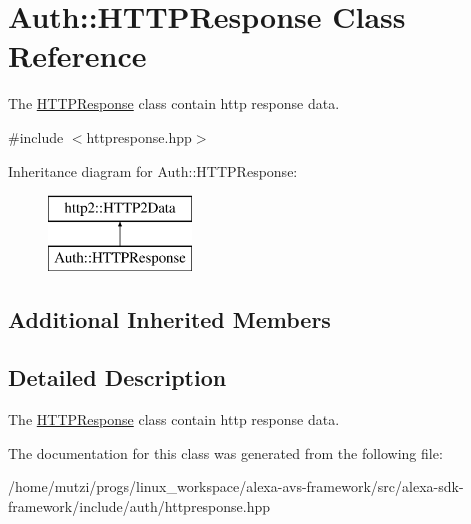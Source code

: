\hypertarget{classAuth_1_1HTTPResponse}{}\section{Auth\+:\+:H\+T\+T\+P\+Response Class Reference}
\label{classAuth_1_1HTTPResponse}


The \hyperlink{classAuth_1_1HTTPResponse}{H\+T\+T\+P\+Response} class contain http response data.  




{\ttfamily \#include $<$httpresponse.\+hpp$>$}

Inheritance diagram for Auth\+:\+:H\+T\+T\+P\+Response\+:\begin{figure}[H]
\begin{center}
\leavevmode
\includegraphics[height=2.000000cm]{d4/d21/classAuth_1_1HTTPResponse}
\end{center}
\end{figure}
\subsection*{Additional Inherited Members}


\subsection{Detailed Description}
The \hyperlink{classAuth_1_1HTTPResponse}{H\+T\+T\+P\+Response} class contain http response data. 

The documentation for this class was generated from the following file\+:\begin{DoxyCompactItemize}
\item 
/home/mutzi/progs/linux\+\_\+workspace/alexa-\/avs-\/framework/src/alexa-\/sdk-\/framework/include/auth/httpresponse.\+hpp\end{DoxyCompactItemize}
